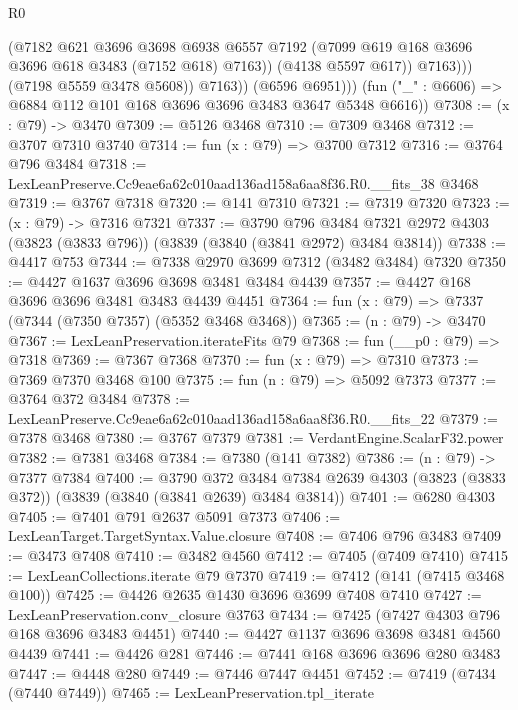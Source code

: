 \begin{lexlean}{R0}
\begin{coremodule}
                        (@7182
                          @621
                          @3696
                          @3698
                          @6938
                          @6557
                          @7192
                          (@7099 @619 @168 @3696 @3696 @618 @3483 (@7152 @618) @7163))
                        (@4138 @5597 @617))
                      @7163)))
                (@7198 @5559 @3478 @5608))
              @7163))
          (@6596 @6951)))
      (fun ("_" : @6606) => @6884 @112 @101 @168 @3696 @3696 @3483 @3647 @5348 @6616))
@7308 := (x : @79) -> @3470
@7309 := @5126 @3468
@7310 := @7309 @3468
@7312 := @3707 @7310 @3740
@7314 := fun (x : @79) => @3700 @7312
@7316 := @3764 @796 @3484
@7318 := LexLeanPreserve.Cc9eae6a62c010aad136ad158a6aa8f36.R0.__fits_38 @3468
@7319 := @3767 @7318
@7320 := @141 @7310
@7321 := @7319 @7320
@7323 := (x : @79) -> @7316 @7321
@7337 := @3790
    @796
    @3484
    @7321
    @2972
    @4303
    (@3823 (@3833 @796))
    (@3839 (@3840 (@3841 @2972) @3484 @3814))
@7338 := @4417 @753
@7344 := @7338 @2970 @3699 @7312 (@3482 @3484) @7320
@7350 := @4427 @1637 @3696 @3698 @3481 @3484 @4439
@7357 := @4427 @168 @3696 @3696 @3481 @3483 @4439 @4451
@7364 := fun (x : @79) => @7337 (@7344 (@7350 @7357) (@5352 @3468 @3468))
@7365 := (n : @79) -> @3470
@7367 := LexLeanPreservation.iterateFits @79
@7368 := fun (__p0 : @79) => @7318
@7369 := @7367 @7368
@7370 := fun (x : @79) => @7310
@7373 := @7369 @7370 @3468 @100
@7375 := fun (n : @79) => @5092 @7373
@7377 := @3764 @372 @3484
@7378 := LexLeanPreserve.Cc9eae6a62c010aad136ad158a6aa8f36.R0.__fits_22
@7379 := @7378 @3468
@7380 := @3767 @7379
@7381 := VerdantEngine.ScalarF32.power
@7382 := @7381 @3468
@7384 := @7380 (@141 @7382)
@7386 := (n : @79) -> @7377 @7384
@7400 := @3790
    @372
    @3484
    @7384
    @2639
    @4303
    (@3823 (@3833 @372))
    (@3839 (@3840 (@3841 @2639) @3484 @3814))
@7401 := @6280 @4303
@7405 := @7401 @791 @2637 @5091 @7373
@7406 := LexLeanTarget.TargetSyntax.Value.closure
@7408 := @7406 @796 @3483
@7409 := @3473 @7408
@7410 := @3482 @4560
@7412 := @7405 (@7409 @7410)
@7415 := LexLeanCollections.iterate @79 @7370
@7419 := @7412 (@141 (@7415 @3468 @100))
@7425 := @4426 @2635 @1430 @3696 @3699 @7408 @7410
@7427 := LexLeanPreservation.conv_closure @3763
@7434 := @7425 (@7427 @4303 @796 @168 @3696 @3483 @4451)
@7440 := @4427 @1137 @3696 @3698 @3481 @4560 @4439
@7441 := @4426 @281
@7446 := @7441 @168 @3696 @3696 @280 @3483
@7447 := @4448 @280
@7449 := @7446 @7447 @4451
@7452 := @7419 (@7434 (@7440 @7449))
@7465 := LexLeanPreservation.tpl_iterate

\end{coremodule}
\end{lexlean}
